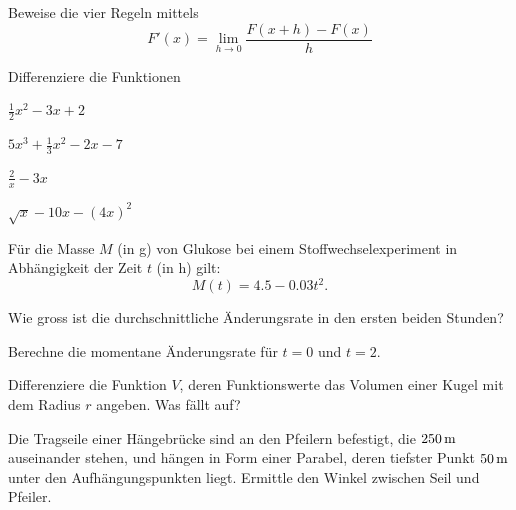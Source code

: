 \documentclass[%
11pt,%
twoside,%
titlepage,%
german,%
headsepline%
]{scrartcl}
\begin{document}
\begin{ueb}[Ableitungsregeln]\label{uebbeweis}
Beweise die vier Regeln mittels
$$F'(x)=\lim_{h\to0}\frac{F(x+h)-F(x)}{h}$$
\end{ueb}

\begin{ueb}[üben]\label{uebdifferenzieren}
Differenziere die Funktionen

\begin{minipage}{5cm}
\begin{enumeratea}
\item $\frac{1}{2}x^2-3x+2$
\item $5x^3+\frac{1}{3}x^2-2x-7$
\end{enumeratea}
\end{minipage}
\begin{minipage}{5cm}
\begin{enumeratea}
\addtocounter{enumi}{2}
\item $\frac{2}{x}-3x$
\item $\sqrt{x}-10x-(4x)^2$
\end{enumeratea}
\end{minipage}
\end{ueb}

\begin{ueb}[Glukose]\label{uebglukose}
F\"ur
die Masse $M$ (in g) von Glukose bei einem Stoffwechselexperiment in Abh\"angigkeit der Zeit $t$ (in h) gilt:
$$M(t)=4.5-0.03t^2.$$
\begin{enumeratea}
\item Wie gross ist die durchschnittliche \"Anderungsrate in den ersten beiden Stunden?
\item Berechne die momentane \"Anderungsrate f\"ur $t=0$ und $t=2$.
\end{enumeratea}
\end{ueb}

\begin{ueb}[Kugel]\label{uebvolumen}
Differenziere die Funktion $V$, deren Funktionswerte das Volumen einer Kugel mit dem Radius $r$ angeben. Was f\"allt auf?
\end{ueb}

\begin{ueb}[Hängebrücke]\label{uebbrucke}
Die
Tragseile einer H\"angebr\"ucke sind an den Pfeilern befestigt, die $\unit[250]{m}$ auseinander stehen, und h\"angen in Form einer Parabel, deren tiefster Punkt $\unit[50]{m}$ unter den Aufh\"angungspunkten liegt. Ermittle den Winkel zwischen Seil und Pfeiler.
\end{ueb}
\end{document}
